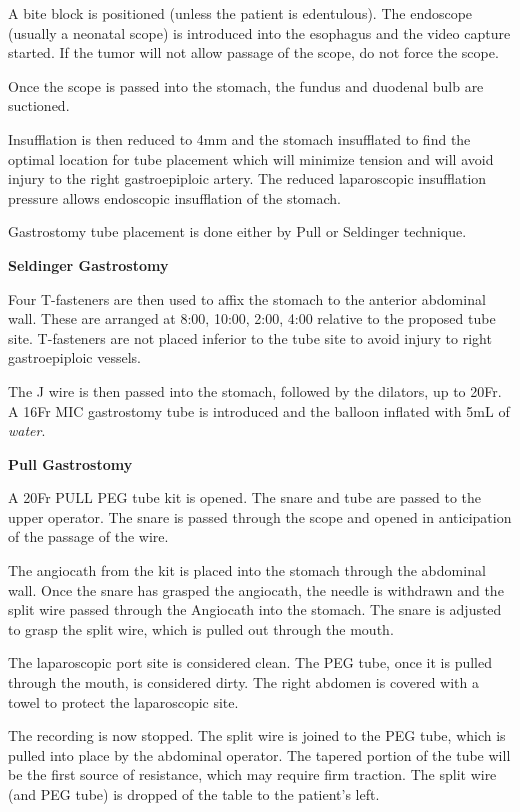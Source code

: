 \documentclass[
]{book}
\begin{document}
A bite block is positioned (unless the patient is edentulous). The endoscope (usually a neonatal scope) is introduced into the esophagus and the video capture started. If the tumor will not allow passage of the scope, do not force the scope.

Once the scope is passed into the stomach, the fundus and duodenal bulb are suctioned.

Insufflation is then reduced to 4mm and the stomach insufflated to find the optimal location for tube placement which will minimize tension and will avoid injury to the right gastroepiploic artery. The reduced laparoscopic insufflation pressure allows endoscopic insufflation of the stomach.

Gastrostomy tube placement is done either by Pull or Seldinger technique.

\textbf{Seldinger Gastrostomy}

Four T-fasteners are then used to affix the stomach to the anterior abdominal wall. These are arranged at 8:00, 10:00, 2:00, 4:00 relative to the proposed tube site. T-fasteners are not placed inferior to the tube site to avoid injury to right gastroepiploic vessels.

The J wire is then passed into the stomach, followed by the dilators, up to 20Fr. A 16Fr MIC gastrostomy tube is introduced and the balloon inflated with 5mL of \emph{water}.

\textbf{Pull Gastrostomy}

A 20Fr PULL PEG tube kit is opened. The snare and tube are passed to the upper operator. The snare is passed through the scope and opened in anticipation of the passage of the wire.

The angiocath from the kit is placed into the stomach through the abdominal wall. Once the snare has grasped the angiocath, the needle is withdrawn and the split wire passed through the Angiocath into the stomach. The snare is adjusted to grasp the split wire, which is pulled out through the mouth.

The laparoscopic port site is considered clean. The PEG tube, once it is pulled through the mouth, is considered dirty. The right abdomen is covered with a towel to protect the laparoscopic site.

The recording is now stopped. The split wire is joined to the PEG tube, which is pulled into place by the abdominal operator. The tapered portion of the tube will be the first source of resistance, which may require firm traction. The split wire (and PEG tube) is dropped of the table to the patient's left.
\end{document}
